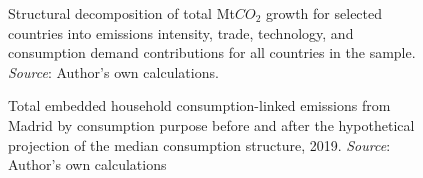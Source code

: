 \documentclass[
  10pt,
  twocolumn]{aft}
\begin{document}
\begin{figure}


\caption{\label{fig-sda-decomposition-cou}Structural decomposition of
total Mt\(CO_2\) growth for selected countries into emissions intensity,
trade, technology, and consumption demand contributions for all
countries in the sample. \emph{Source}: Author's own calculations.}

\end{figure}%
\begin{figure}


\caption{\label{fig-cf-coicopCO2}Total embedded household
consumption-linked emissions from Madrid by consumption purpose before
and after the hypothetical projection of the median consumption
structure, 2019. \emph{Source}: Author's own calculations}

\end{figure}%
\end{document}
